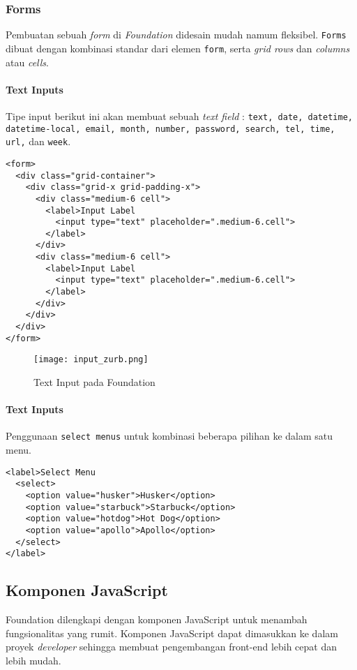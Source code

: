\begin{enumerate}
\subsubsection{Forms}
\label{sssec:css_3}
Pembuatan sebuah \textit{form} di \textit{Foundation} didesain mudah namum fleksibel. \texttt{Forms} dibuat dengan kombinasi standar dari elemen \texttt{form}, serta \textit{grid rows} dan \textit{columns} atau \textit{cells}. \cite{zurbfoundation:17}

\paragraph{Text Inputs}
Tipe input berikut ini akan membuat sebuah \textit{text field} : \verb|text, date, datetime, datetime-local, email, month, number, password, search, tel, time, url,| dan \verb|week|.

\begin{lstlisting}[frame=single] 
<form>
  <div class="grid-container">
    <div class="grid-x grid-padding-x">
      <div class="medium-6 cell">
        <label>Input Label
          <input type="text" placeholder=".medium-6.cell">
        </label>
      </div>
      <div class="medium-6 cell">
        <label>Input Label
          <input type="text" placeholder=".medium-6.cell">
        </label>
      </div>
    </div>
  </div>
</form>
\end{lstlisting}

\begin{figure} [H]
	\centering  
	\texttt{[image: input\_zurb.png]}  
	\caption{Text Input pada Foundation}
	\label{fig:gridbasic_zurb} 
\end{figure}

\paragraph{Text Inputs}
Penggunaan \texttt{select menus} untuk kombinasi beberapa pilihan ke dalam satu menu.
\begin{lstlisting}[frame=single] 
<label>Select Menu
  <select>
    <option value="husker">Husker</option>
    <option value="starbuck">Starbuck</option>
    <option value="hotdog">Hot Dog</option>
    <option value="apollo">Apollo</option>
  </select>
</label>
\end{lstlisting}\cite{zurbfoundation:17}

\subsection{Komponen JavaScript}
\label{subs:javascript_zurb}
Foundation dilengkapi dengan komponen JavaScript untuk menambah fungsionalitas yang rumit. Komponen JavaScript dapat dimasukkan ke dalam proyek \textit{developer} sehingga membuat pengembangan front-end lebih cepat dan lebih mudah.


\end{enumerate}
